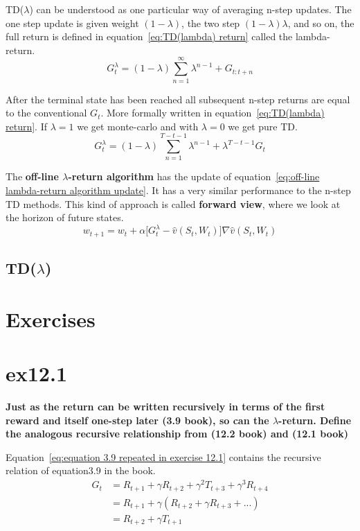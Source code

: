 TD($\lambda$) can be understood as one particular way of averaging n-step updates. The one step update is given weight $(1 - \lambda)$, the two step $(1-\lambda)\lambda$, and so on, the full return is defined in equation~\ref{eq:TD(lambda) return} called the lambda-return. 
\begin{equation}
G_t^{\lambda} = (1-\lambda)  \sum^{\infty}_{n=1}\lambda^{n-1} + G_{t:t+n}
\label{eq:TD(lambda) return}
\end{equation}

After the terminal state has been reached all subsequent n-step returns are equal to the conventional $G_t$. More formally written in equation~\ref{eq:TD(lambda) return}. If $\lambda=1$ we get monte-carlo and with $\lambda=0$ we get pure TD. 
\begin{equation}
G_t^{\lambda} = (1-\lambda) \sum^{T-t-1}_{n=1}\lambda^{n-1} + \lambda^{T-t-1} G_t
\label{eq:TD(lambda) n-step return}
\end{equation}

The \textbf{off-line $\lambda$-return algorithm} has the update of equation~\ref{eq:off-line lambda-return algorithm update}. It has a very similar performance to the n-step TD methods. This kind of approach is called \textbf{forward view}, where we look at the horizon of future states. 
\begin{equation}
w_{t+1} = w_t + \alpha \big[G_t^{\lambda} - \hat{v}(S_t, W_t) \big]\nabla\hat{v}(S_t, W_t)
\label{eq:off-line lambda-return algorithm update}
\end{equation}

\subsection{TD($\lambda$)}

\section{Exercises}

\section{ex12.1}
\textbf{Just as the return can be written recursively in terms of the first reward and itself one-step later (3.9 book), so can the $\lambda$-return. Define the analogous recursive relationship from (12.2 book) and (12.1 book)}

Equation~\ref{eq:equation 3.9 repeated in exercise 12.1} contains the recursive relation of equation3.9 in the book.
\begin{equation}
\begin{split}
G_t & =  R_{t+1} + \gamma R_{t+2} + \gamma^2 T_{t+3} + \gamma^3 R_{t+4} \\
& = R_{t+1} + \gamma(R_{t+2} + \gamma R_{t+3} + ...) \\
& = R_{t+2} + \gamma T_{t+1}
\end{split}
\label{eq:equation 3.9 repeated in exercise 12.1}
\end{equation}

